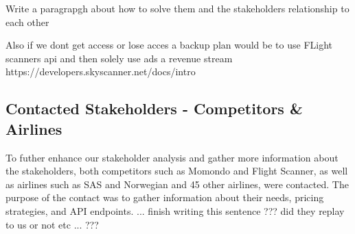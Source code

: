 Write a paragrapgh about how to solve them and the stakeholders relationship to each other

Also if we dont get access or lose acces a backup plan would be to use FLight scanners api and then solely use ads a revenue stream
https://developers.skyscanner.net/docs/intro

\subsection{Contacted Stakeholders - Competitors & Airlines}
To futher enhance our stakeholder analysis and gather more information about the stakeholders, both competitors such as Momondo and Flight Scanner, as well as airlines such as SAS and Norwegian and 45 other airlines, were contacted. The purpose of the contact was to gather information about their needs, pricing strategies, and API endpoints. 
... finish writing this sentence ??? did they replay to us or not etc ... ???